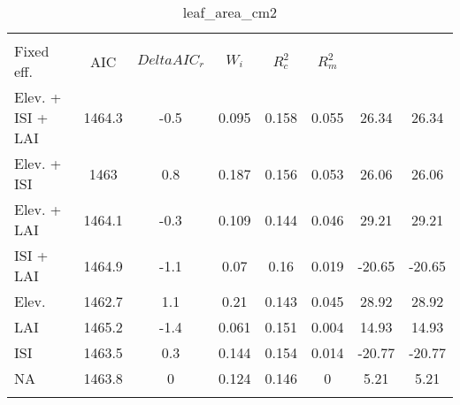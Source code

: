 
\begin{table}[!htbp] \centering 
  \caption{leaf_area_cm2} 
  \label{leaf_area_cm2} 
\begin{tabular}{@{\extracolsep{5pt}} lS[table-format=3.2]S[table-format=3.2]S[table-format=3.2]S[table-format=3.2]S[table-format=3.2]S[table-format=3.2]S[table-format=3.2]} 
\\[-1.8ex]\hline 
\hline \\[-1.8ex] 
{Fixed eff.} & {AIC} & {$Delta{}AIC_r$} & {$W_i$} & {$R^2_c$} & {$R^2_m$} %
\hline \\[-1.8ex] 
Elev. + ISI + LAI & 1464.3 & -0.5 & 0.095 & 0.158 & 0.055 & 26.34 & 26.34 \\ 
Elev. + ISI & 1463 & 0.8 & 0.187 & 0.156 & 0.053 & 26.06 & 26.06 \\ 
Elev. + LAI & 1464.1 & -0.3 & 0.109 & 0.144 & 0.046 & 29.21 & 29.21 \\ 
ISI + LAI & 1464.9 & -1.1 & 0.07 & 0.16 & 0.019 & -20.65 & -20.65 \\ 
Elev. & 1462.7 & 1.1 & 0.21 & 0.143 & 0.045 & 28.92 & 28.92 \\ 
LAI & 1465.2 & -1.4 & 0.061 & 0.151 & 0.004 & 14.93 & 14.93 \\ 
ISI & 1463.5 & 0.3 & 0.144 & 0.154 & 0.014 & -20.77 & -20.77 \\ 
NA & 1463.8 & 0 & 0.124 & 0.146 & 0 & 5.21 & 5.21 \\ 
\hline \\[-1.8ex] 
\end{tabular} 
\end{table} 
